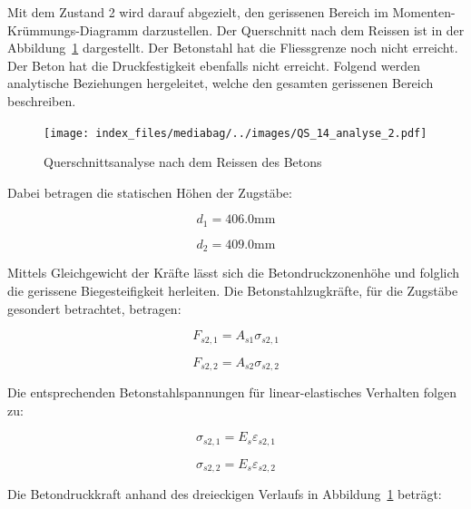 \documentclass[
  12pt,
  letterpaper,
  egregdoesnotlikesansseriftitles]{scrreprt}
\begin{document}
Mit dem Zustand 2 wird darauf abgezielt, den gerissenen Bereich im
Momenten-Krümmungs-Diagramm darzustellen. Der Querschnitt nach dem
Reissen ist in der Abbildung~\ref{fig-qs3_sv14} dargestellt. Der
Betonstahl hat die Fliessgrenze noch nicht erreicht. Der Beton hat die
Druckfestigkeit ebenfalls nicht erreicht. Folgend werden analytische
Beziehungen hergeleitet, welche den gesamten gerissenen Bereich
beschreiben.

\begin{figure}[H]

{\centering \texttt{[image: index\_files/mediabag/../images/QS\_14\_analyse\_2.pdf]}

}

\caption{\label{fig-qs3_sv14}Querschnittsanalyse nach dem Reissen des
Betons}

\end{figure}

Dabei betragen die statischen Höhen der Zugstäbe:

\begin{equation}d_{1} = 406.0 \text{mm}\end{equation}

\begin{equation}d_{2} = 409.0 \text{mm}\end{equation}

Mittels Gleichgewicht der Kräfte lässt sich die Betondruckzonenhöhe und
folglich die gerissene Biegesteifigkeit herleiten. Die
Betonstahlzugkräfte, für die Zugstäbe gesondert betrachtet, betragen:

\begin{equation}F_{s2,1} = A_{s 1} \sigma_{s 2,1}\end{equation}

\begin{equation}F_{s2,2} = A_{s 2} \sigma_{s 2,2}\end{equation}

Die entsprechenden Betonstahlspannungen für linear-elastisches Verhalten
folgen zu:

\begin{equation}\sigma_{s 2,1} = E_{s} \varepsilon_{s2,1}\end{equation}

\begin{equation}\sigma_{s 2,2} = E_{s} \varepsilon_{s2,2}\end{equation}

Die Betondruckkraft anhand des dreieckigen Verlaufs in
Abbildung~\ref{fig-qs3_sv14} beträgt:
\end{document}
